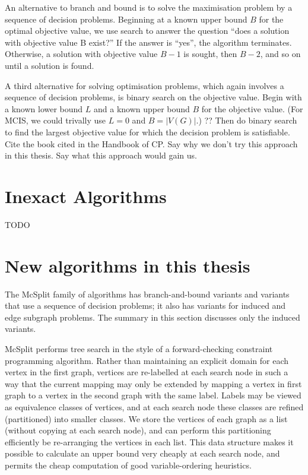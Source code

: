 An alternative to branch and bound is to solve the maximisation problem by a
sequence of decision problems. Beginning at a known upper bound $B$ for the
optimal objective value, we use search to answer the question “does a solution
with objective value B exist?” If the answer is “yes”, the algorithm
terminates. Otherwise, a solution with objective value $B-1$ is sought, then $B-2$,
and so on until a solution is found.

A third alternative for solving optimisation problems, which again involves a
sequence of decision problems, is binary search on the objective value. Begin
with a known lower bound $L$ and a known upper bound $B$ for the objective value.
(For MCIS, we could trivally use $L=0$ and $B=|V(G)|$.) ?? Then do binary search to
find the largest objective value for which the decision problem is satisfiable.
Cite the book cited in the Handbook of CP. Say why we don’t try this approach
in this thesis.  Say what this approach would gain us.

\section{Inexact Algorithms}

TODO

\section{New algorithms in this thesis}

The McSplit family of algorithms has branch-and-bound variants and variants
that use a sequence of decision problems; it also has variants for induced and
edge subgraph problems. The summary in this section discusses only the induced
variants.

McSplit performs tree search in the style of a forward-checking constraint
programming algorithm. Rather than maintaining an explicit domain for each
vertex in the first graph, vertices are re-labelled at each search node in such
a way that the current mapping may only be extended by mapping a vertex in
first graph to a vertex in the second graph with the same label. Labels may be
viewed as equivalence classes of vertices, and at each search node these
classes are refined (partitioned) into smaller classes. We store the vertices
of each graph as a list (without copying at each search node), and can perform
this partitioning efficiently be re-arranging the vertices in each list. This
data structure makes it possible to calculate an upper bound very cheaply at
each search node, and permits the cheap computation of good variable-ordering
heuristics.

